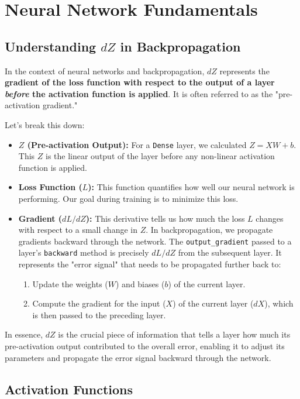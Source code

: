 \documentclass{article}
\begin{document}
\section*{Neural Network Fundamentals}

\subsection*{Understanding $dZ$ in Backpropagation}

In the context of neural networks and backpropagation, $dZ$ represents the \textbf{gradient of the loss function with respect to the output of a layer \textit{before} the activation function is applied}. It is often referred to as the "pre-activation gradient."

Let's break this down:
\begin{itemize}
    \item \textbf{$Z$ (Pre-activation Output):} For a \texttt{Dense} layer, we calculated $Z = XW + b$. This $Z$ is the linear output of the layer before any non-linear activation function is applied.
    \item \textbf{Loss Function ($L$):} This function quantifies how well our neural network is performing. Our goal during training is to minimize this loss.
    \item \textbf{Gradient ($dL/dZ$):} This derivative tells us how much the loss $L$ changes with respect to a small change in $Z$. In backpropagation, we propagate gradients backward through the network. The \texttt{output_gradient} passed to a layer's \texttt{backward} method is precisely $dL/dZ$ from the subsequent layer. It represents the "error signal" that needs to be propagated further back to:
    \begin{enumerate}
        \item Update the weights ($W$) and biases ($b$) of the current layer.
        \item Compute the gradient for the input ($X$) of the current layer ($dX$), which is then passed to the preceding layer.
    \end{enumerate}
\end{itemize}
In essence, $dZ$ is the crucial piece of information that tells a layer how much its pre-activation output contributed to the overall error, enabling it to adjust its parameters and propagate the error signal backward through the network.

\subsection*{Activation Functions}
\end{document}
